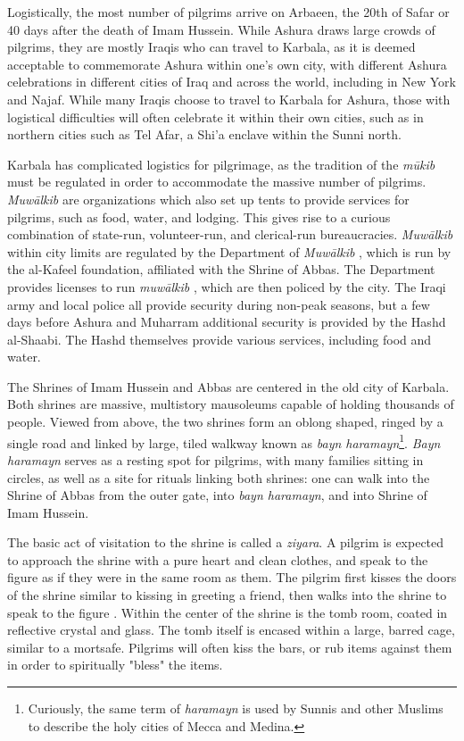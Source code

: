Logistically, the most number of pilgrims arrive on Arbaeen, the 20th of Safar or 40 days after the death of Imam Hussein. While Ashura draws large crowds of pilgrims, they are mostly Iraqis who can travel to Karbala, as it is deemed acceptable to commemorate Ashura within one’s own city, with different Ashura celebrations in different cities of Iraq and across the world, including in New York and Najaf. While many Iraqis choose to travel to Karbala for Ashura, those with logistical difficulties will often celebrate it within their own cities, such as in northern cities such as Tel Afar, a Shi'a enclave within the Sunni north.  

Karbala has complicated logistics for pilgrimage, as the tradition of the \emph{mūkib} must be regulated in order to accommodate the massive number of pilgrims. \emph{Muwālkib}  are organizations which also set up tents to provide services for pilgrims, such as food, water, and lodging. This gives rise to a curious combination of state-run, volunteer-run, and clerical-run bureaucracies. \emph{Muwālkib}  within city limits are regulated by the Department of \emph{Muwālkib} , which is run by the al-Kafeel foundation, affiliated with the Shrine of Abbas. The Department provides licenses to run \emph{muwālkib} , which are then policed by the city. The Iraqi army and local police all provide security during non-peak seasons, but a few days before Ashura and Muharram additional security is provided by the Hashd al-Shaabi. The Hashd themselves provide various services, including food and water.

The Shrines of Imam Hussein and Abbas are centered in the old city of Karbala. Both shrines are massive, multistory mausoleums capable of holding thousands of people. Viewed from above, the two shrines form an oblong shaped, ringed by a single road and linked by large, tiled walkway known as \emph{bayn haramayn}\footnote{Curiously, the same term of \emph{haramayn} is used by Sunnis and other Muslims to describe the holy cities of Mecca and Medina.}. \emph{Bayn haramayn} serves as a resting spot for pilgrims, with many families sitting in circles, as well as a site for rituals linking both shrines: one can walk into the Shrine of Abbas from the outer gate, into \emph{bayn haramayn}, and into Shrine of Imam Hussein. 

The basic act of visitation to the shrine is called a \emph{ziyara}. A pilgrim is expected to approach the shrine with a pure heart and clean clothes, and speak to the figure as if they were in the same room as them. The pilgrim first kisses the doors of the shrine similar to kissing in greeting a friend, then walks into the shrine to speak to the figure \cite{qisa_publications_illustrated_2018}. Within the center of the shrine is the tomb room, coated in reflective crystal and glass. The tomb itself is encased within a large, barred cage, similar to a mortsafe. Pilgrims will often kiss the bars, or rub items against them in order to spiritually "bless" the items. 

